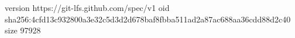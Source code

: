 version https://git-lfs.github.com/spec/v1
oid sha256:4cfd13c932800a3e32c5d3d2d678baf8fbba511ad2a87ac688aa36cdd88d2c40
size 97928
